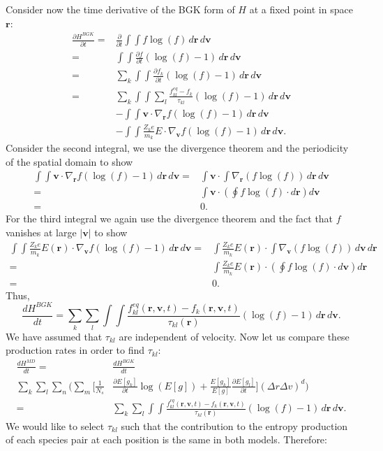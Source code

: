 \documentclass{article}
\begin{document}
Consider now the time derivative of the BGK form of $H$ at a fixed point in space $\mathbf{r}$:
\begin{align*}
\frac{\partial  H^{BGK}}{\partial t}=&\frac{\partial}{\partial t}\int\int f\log(f)\,d\mathbf{r}\,d\mathbf{v}\\
=&\int \int \frac{\partial f}{\partial t}(\log(f)-1)\,d\mathbf{r}\,d\mathbf{v}\\
=&\sum_k\int \int \frac{\partial f_k}{\partial t}(\log(f)-1)\,d\mathbf{r}\,d\mathbf{v}\\
=&\sum_k \int \int \sum_l \frac{f_{kl}^{eq}-f_k}{\tau_{kl}}(\log(f)-1)\,d\mathbf{r}\,d\mathbf{v}\\
&-\int \int \mathbf{v}\cdot \nabla_\mathbf{r}f(\log(f)-1)\,d\mathbf{r}\,d\mathbf{v}\\
&-\int\int \frac{Z_ke}{m_k}E\cdot \nabla_\mathbf{v}f(\log(f)-1)\,d\mathbf{r}\,d\mathbf{v}.
\end{align*}Consider the second integral, we use the divergence theorem and the periodicity of the spatial domain to show
\begin{align*}
\int \int \mathbf{v}\cdot \nabla_\mathbf{r}f(\log(f)-1)\,d\mathbf{r}\,d\mathbf{v}=&\int \mathbf{v}\cdot \int \nabla_\mathbf{r}(f\log(f))\,d\mathbf{r}\,d\mathbf{v}\\
=&\int \mathbf{v}\cdot \left(\oint f\log(f)\cdot d\mathbf{r}\right)d\mathbf{v}\\
=&0.
\end{align*}For the third integral we again use the divergence theorem and the fact that $f$ vanishes at large $|\mathbf{v}|$ to show
\begin{align*}
\int \int \frac{Z_k e}{m_k}E(\mathbf{r})\cdot \nabla_\mathbf{v}f(\log(f)-1)\,d\mathbf{r}\,d\mathbf{v}=&\int \frac{Z_ke}{m_k}E(\mathbf{r})\cdot \int \nabla_\mathbf{v}(f\log(f))\,d\mathbf{v}\,d\mathbf{r}\\
=&\int \frac{Z_k e}{m_k}E(\mathbf{r})\cdot \left(\oint f\log(f)\cdot d\mathbf{v}\right)d\mathbf{r}\\
=&0.
\end{align*}Thus,
\[\frac{d H^{BGK}}{dt}=\sum_k\sum_l\int \int \frac{f_{kl}^{eq}(\mathbf{r},\mathbf{v},t)-f_k(\mathbf{r},\mathbf{v},t)}{\tau_{kl}(\mathbf{r})}(\log(f)-1)\,d\mathbf{r}\,d\mathbf{v}.
\]We have assumed that $\tau_{kl}$ are independent of velocity. Now let us compare these production rates in order to find $\tau_{kl}$:
\begin{align*}
\frac{d H^{MD}}{dt}=&\frac{d H^{BGK}}{dt}\\
\sum_k\sum_l\sum_n\bigg(\sum_m\bigg[\frac{1}{N_s}&\frac{\partial E[g_k]}{\partial t}\log(E[g])+\frac{E[g_k]}{E[g]}\frac{\partial E[g_l]}{\partial t}\bigg](\Delta r\Delta v)^d\bigg)\\=&\sum_k\sum_l\int \int \frac{f_{kl}^{eq}(\mathbf{r},\mathbf{v},t)-f_k(\mathbf{r},\mathbf{v},t)}{\tau_{kl}(\mathbf{r})}(\log(f)-1)\,d\mathbf{r}\,d\mathbf{v}.
\end{align*}We would like to select $\tau_{kl}$ such that the contribution to the entropy production of each species pair at each position is the same in both models. Therefore:
\end{document}
